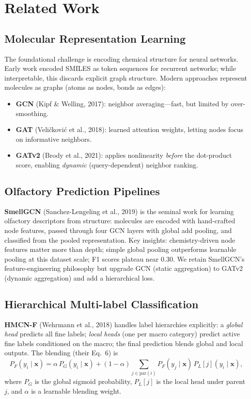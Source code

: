 \documentclass[10pt,twocolumn]{article}
\newcommand{\PF}{P_{F}}
\newcommand{\PG}{P_{G}}
\newcommand{\PL}{P_{L}}
\newcommand{\x}{\mathbf{x}}
\begin{document}
\section{Related Work}

\subsection{Molecular Representation Learning}
The foundational challenge is encoding chemical structure for neural networks. Early work encoded SMILES as token sequences for recurrent networks; while interpretable, this discards explicit graph structure. Modern approaches represent molecules as graphs (atoms as nodes, bonds as edges):
\begin{itemize}[leftmargin=1.2em,itemsep=2pt]
  \item \textbf{GCN} (Kipf \& Welling, 2017): neighbor averaging---fast, but limited by over-smoothing.
  \item \textbf{GAT} (Veli\v{c}kovi\'c et al., 2018): learned attention weights, letting nodes focus on informative neighbors.
  \item \textbf{GATv2} (Brody et al., 2021): applies nonlinearity \emph{before} the dot-product score, enabling \emph{dynamic} (query-dependent) neighbor ranking.
\end{itemize}

\subsection{Olfactory Prediction Pipelines}
\textbf{SmellGCN} (Sanchez-Lengeling et al., 2019) is the seminal work for learning olfactory descriptors from structure: molecules are encoded with hand-crafted node features, passed through four GCN layers with global add pooling, and classified from the pooled representation. Key insights: chemistry-driven node features matter more than depth; simple global pooling outperforms learnable pooling at this dataset scale; F1 scores plateau near $0.30$. We retain SmellGCN's feature-engineering philosophy but upgrade GCN (static aggregation) to GATv2 (dynamic aggregation) and add a hierarchical loss.

\subsection{Hierarchical Multi-label Classification}
\textbf{HMCN-F} (Wehrmann et al., 2018) handles label hierarchies explicitly: a \emph{global head} predicts all fine labels; \emph{local heads} (one per macro category) predict active fine labels conditioned on the macro; the final prediction blends global and local outputs. The blending (their Eq.~6) is
\begin{equation}
\PF(y_i\mid\x) = \alpha\,\PG(y_i\mid\x) + (1-\alpha)\!\!\sum_{j\in\mathrm{par}(i)}\!\!\PF(y_j\mid\x)\,\PL[j](y_i\mid\x),
\label{eq:hmcnf}
\end{equation}
where $\PG$ is the global sigmoid probability, $\PL[j]$ is the local head under parent $j$, and $\alpha$ is a learnable blending weight.
\end{document}
